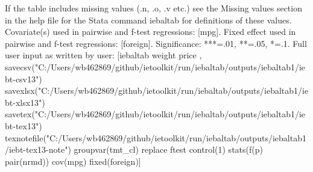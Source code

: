 If the table includes missing values (.n, .o, .v etc.) see the Missing values section in the help file for the Stata command iebaltab for definitions of these values. Covariate(s) used in pairwise and f-test regressions: [mpg]. Fixed effect used in pairwise and f-test regressions: [foreign]. Significance: ***=.01, **=.05, *=.1. Full user input as written by user: [iebaltab weight price , savecsv("C:/Users/wb462869/github/ietoolkit/run/iebaltab/outputs/iebaltab1/iebt-csv13") savexlsx("C:/Users/wb462869/github/ietoolkit/run/iebaltab/outputs/iebaltab1/iebt-xlsx13") savetex("C:/Users/wb462869/github/ietoolkit/run/iebaltab/outputs/iebaltab1/iebt-tex13") texnotefile("C:/Users/wb462869/github/ietoolkit/run/iebaltab/outputs/iebaltab1/iebt-tex13-note") groupvar(tmt\_cl) replace ftest control(1) stats(f(p) pair(nrmd)) cov(mpg) fixed(foreign)] 
